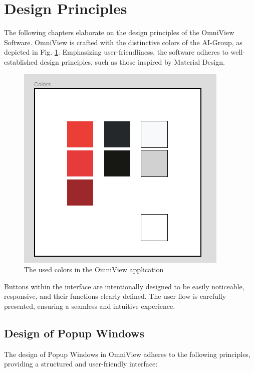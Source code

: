 \documentclass[]{scrreprt}
\begin{document}
\section{Design Principles}\label{cap:Designprinciples}

The following chapters elaborate on the design principles of the OmniView Software. OmniView is crafted with the distinctive colors of the AI-Group, as depicted in Fig. \ref{fig: AIGroupColors}. Emphasizing user-friendliness, the software adheres to well-established design principles, such as those inspired by Material Design.

\begin{figure}
    \includegraphics[width=.6\textwidth]{assets/pictures/Colors.png}
    \caption[]{The used colors in the OmniView application}
    \label{fig: AIGroupColors}
\end{figure}

Buttons within the interface are intentionally designed to be easily noticeable, responsive, and their functions clearly defined. The user flow is carefully presented, ensuring a seamless and intuitive experience.

\subsection{Design of Popup Windows}\label{cap:Designprinciples_Popupwindows}

The design of Popup Windows in OmniView adheres to the following principles, providing a structured and user-friendly interface:
\end{document}
